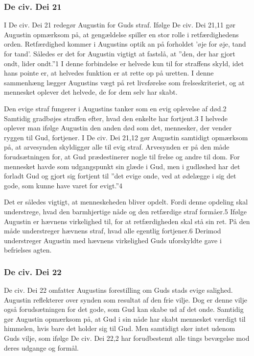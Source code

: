 \subsubsection{De civ. Dei 21}
I De civ. Dei 21 redegør Augustin for Guds straf. Ifølge De civ. Dei 21,11 gør Augustin opmærksom på, at gengældelse spiller en stor rolle i retfærdighedens orden. Retfærdighed kommer i Augustins optik an på forholdet ’øje for øje, tand for tand’. Således er det for Augustin vigtigt at fastslå, at ”den, der har gjort ondt, lider ondt.”1 I denne forbindelse er helvede kun til for straffens skyld, idet hans pointe er, at helvedes funktion er at rette op på uretten. I denne sammenhæng lægger Augustins vægt på ret livsførelse som frelseskriteriet, og at mennesket oplever det helvede, de for dem selv har skabt.

Den evige straf fungerer i Augustins tanker som en evig oplevelse af død.2 Samtidig gradbøjes straffen efter, hvad den enkelte har fortjent.3 I helvede oplever man ifølge Augustin den anden død som det, mennesker, der vender ryggen til Gud, fortjener. I De civ. Dei 21,12 gør Augustin samtidigt opmærksom på, at arvesynden skyldiggør alle til evig straf. Arvesynden er på den måde forudsætningen for, at Gud prædestinerer nogle til frelse og andre til dom. For mennesket havde som udgangspunkt sin glæde i Gud, men i gudløshed har det forladt Gud og gjort sig fortjent til ”det evige onde, ved at ødelægge i sig det gode, som kunne have varet for evigt.”4

Det er således vigtigt, at menneskeheden bliver opdelt. Fordi denne opdeling skal understrege, hvad den barmhjertige nåde og den retfærdige straf formåer.5 Ifølge Augustin er hævnens virkelighed til, for at retfærdigheden skal stå sin ret. På den måde understreger hævnens straf, hvad alle egentlig fortjener.6 Derimod understreger Augustin med hævnens virkelighed Guds uforskyldte gave i befrielses agten.

\subsubsection{De civ. Dei 22}
De civ. Dei 22 omfatter Augustins forestilling om Guds stads evige salighed. Augustin reflekterer over synden som resultat af den frie vilje. Dog er denne vilje også forudsætningen for det gode, som Gud kan skabe ud af det onde. Samtidig gør Augustin opmærksom på, at Gud i sin nåde har skabt mennesket værdigt til himmelen, hvis bare det holder sig til Gud. Men samtidigt sker intet udenom Guds vilje, som ifølge De civ. Dei 22,2 har forudbestemt alle tings bevægelse mod deres udgange og formål.

